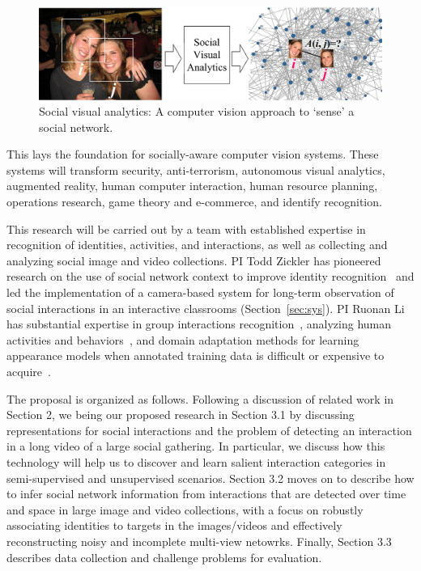 \begin{figure}[t!]
\begin{center}
\includegraphics[width=\columnwidth]{intro}
\end{center}
\vspace{-0.25in} \caption{\captionsize 
Social visual analytics: A computer vision approach to `sense' a social network. \label{fig:intro}\afterfigspace}
\end{figure}

This lays the foundation for socially-aware computer vision systems. These systems will transform security, anti-terrorism, autonomous visual analytics, augmented reality, human computer interaction, human resource planning, operations research, game theory and e-commerce, and identify recognition. 

This research will be carried out by a team with established expertise in recognition of identities, activities, and interactions, as well as collecting and analyzing social image and video collections. PI Todd Zickler has pioneered research on the use of social network context to improve identity recognition~\cite{Stone2008,Stone2010} and led the implementation of a camera-based system for long-term observation of social interactions in an interactive classrooms (Section~\ref{sec:sys}). PI Ruonan Li has substantial expertise in group interactions recognition~\cite{LiIJCV2012}, analyzing human activities and behaviors~\cite{Li2010,LiPAMI2012}, and domain adaptation methods for learning appearance models when annotated training data is difficult or expensive to acquire~\cite{LiZickler2012,Li2011}. 

The proposal is organized as follows. Following a discussion of related work in Section 2, we being our proposed research in Section 3.1 by discussing representations for social interactions and the problem of detecting an interaction in a long video of a large social gathering. In particular, we discuss how this technology will help us to discover and learn salient interaction categories in semi-supervised and unsupervised scenarios. Section 3.2 moves on to describe how to infer social network information from interactions that are detected over time and space in large image and video collections, with a focus on robustly associating identities to targets in the images/videos and effectively reconstructing noisy and incomplete multi-view netowrks. Finally, Section 3.3 describes data collection and challenge problems for evaluation.



